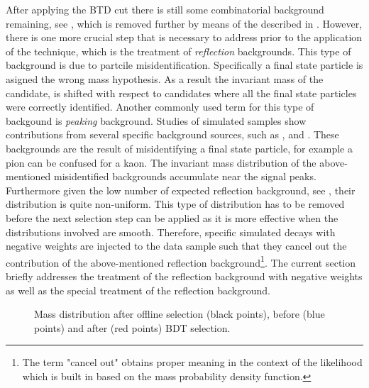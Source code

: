 After applying the BTD cut there is still some combinatorial background remaining, see ,
which is removed further by means of the \sWeights described in .
However, there is one more crucial step that is necessary to address prior to the application of the
\sPlot technique, which is the treatment of {\it reflection} backgrounds. This type of background is due to partcile misidentification.
Specifically a final state particle is asigned the wrong mass hypothesis. As a result the invariant mass of the \Bs candidate,
is shifted with respect to \Bs candidates where all the final state particles were correctly identified.
Another commonly used term for this type of backgound is {\it peaking} background. Studies of simulated samples show contributions
from several specific background sources, such as \BsJpsiKK, \BsJpsipipi and \BdJpsipipi.
These backgrounds are the result of misidentifying a final state particle, for example a pion can
be confused for a kaon. The invariant mass distribution of the above-mentioned misidentified backgrounds
accumulate near the \BJpsiKpi signal peaks. Furthermore given the low number of expected reflection background,
see , their distribution is quite non-uniform.
This type of distribution has to be removed before the next selection step can be applied as it is more effective
when the distributions involved are smooth. Therefore, specific simulated decays with negative weights
are injected to the data sample such that they cancel out the contribution of the above-mentioned reflection
background\footnote{The term "cancel out" obtains proper meaning in the context of the likelihood which is built
in  based on the mass probability density function.}.
The current section briefly addresses the treatment of the reflection background with negative weights
as well as the special treatment of the \LbJpsippi reflection background.

\begin{figure}[!t]
  \centering
  \scalebox{1}{}
  \caption{Mass distribution after offline selection (black points), before (blue points) and after (red points) BDT selection.}
  \label{mass_BDTG_selection}
\end{figure}

